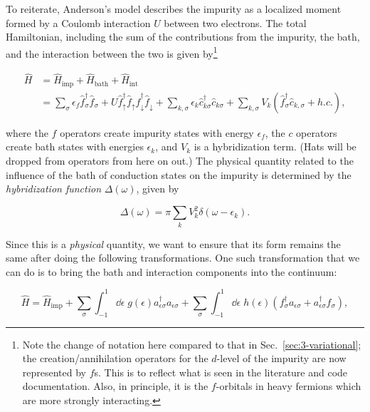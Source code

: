 To reiterate, Anderson's model describes the impurity as a localized moment formed by a Coulomb interaction $U$ between two electrons. The total Hamiltonian, including the sum of the contributions from the impurity, the bath, and the interaction between the two is given by\footnote{Note the change of notation here compared to that in Sec.~\ref{sec:3-variational}; the creation/annihilation operators for the $d$-level of the impurity are now represented by $f$s. This is to reflect what is seen in the literature and code documentation. Also, in principle, it is the $f$-orbitals in heavy fermions which are more strongly interacting.}

\begin{align}
  \hat{H} &= \hat{H}_{\text{imp}} + \hat{H}_{\text{bath}} + \hat{H}_{\text{int}} \\
          &= \sum_\sigma \epsilon_f \hat{f}^\dagger_\sigma \hat{f}_\sigma + U\hat{f}^\dagger_\uparrow \hat{f}_\uparrow \hat{f}^\dagger_\downarrow \hat{f}_\downarrow + \sum_{k,\sigma}\epsilon_k \hat{c}^\dagger_{k\sigma}\hat{c}_{k\sigma} + \sum_{k,\sigma}V_k(\hat{f}^\dagger_\sigma \hat{c}_{k,\sigma} + h.c.),
\end{align}

where the $f$ operators create impurity states with energy $\epsilon_f$, the $c$ operators create bath states with energies $\epsilon_k$, and $V_k$ is a hybridization term. (Hats will be dropped from operators from here on out.) The physical quantity related to the influence of the bath of conduction states on the impurity is determined by the \textit{hybridization function} $\Delta(\omega)$, given by

\begin{equation}
  \Delta(\omega) = \pi\sum_k V_k^2 \delta(\omega - \epsilon_k).
\end{equation}

Since this is a \textit{physical} quantity, we want to ensure that its form remains the same after doing the following transformations. One such transformation that we can do is to bring the bath and interaction components into the continuum:

\begin{equation}
  \hat{H} = \hat{H}_{\mathrm{imp}} + \sum_\sigma \int_{-1}^1 \dd\epsilon \; g(\epsilon) a^\dagger_{\epsilon\sigma}a_{\epsilon\sigma} + \sum_\sigma \int_{-1}^1 \dd\epsilon \; h(\epsilon)(f^\dagger_\sigma a_{\epsilon\sigma} + a^\dagger_{\epsilon\sigma}f_{\sigma}),\label{eq:continuous-hamiltonian}
\end{equation}

